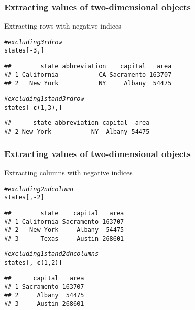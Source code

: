 \documentclass[12pt]{beamer}\usepackage[]{graphicx}\usepackage[]{color}
\makeatletter
\newcommand{\hlnum}[1]{\textcolor[rgb]{0.686,0.059,0.569}{#1}}%
\newcommand{\hlcom}[1]{\textcolor[rgb]{0.678,0.584,0.686}{\textit{#1}}}%
\newcommand{\hlopt}[1]{\textcolor[rgb]{0,0,0}{#1}}%
\newcommand{\hlstd}[1]{\textcolor[rgb]{0.345,0.345,0.345}{#1}}%
\newcommand{\hlkwd}[1]{\textcolor[rgb]{0.737,0.353,0.396}{\textbf{#1}}}%
\newenvironment{kframe}{%
 \def\at@end@of@kframe{}%
 \ifinner\ifhmode%
  \def\at@end@of@kframe{\end{minipage}}%
  \begin{minipage}{\columnwidth}%
 \fi\fi%
 \def\FrameCommand##1{\hskip\@totalleftmargin \hskip-\fboxsep
 \colorbox{shadecolor}{##1}\hskip-\fboxsep
     \hskip-\linewidth \hskip-\@totalleftmargin \hskip\columnwidth}%
 \MakeFramed {\advance\hsize-\width
   \@totalleftmargin\z@ \linewidth\hsize
   \@setminipage}}%
 {\par\unskip\endMakeFramed%
 \at@end@of@kframe}
\newenvironment{knitrout}{}{} %
\makeatother
\begin{document}

\begin{frame}[fragile]
\frametitle{Extracting values of two-dimensional objects}

Extracting rows with negative indices
\begin{knitrout}\footnotesize
{}\color{fgcolor}\begin{kframe}
\begin{alltt}
\hlcom{# excluding 3rd row}
\hlstd{states[}\hlopt{-}\hlnum{3}\hlstd{, ]}
\end{alltt}
\begin{verbatim}
##        state abbreviation    capital   area
## 1 California           CA Sacramento 163707
## 2   New York           NY     Albany  54475
\end{verbatim}
\begin{alltt}
\hlcom{# excluding 1st and 3rd row}
\hlstd{states[}\hlopt{-}\hlkwd{c}\hlstd{(}\hlnum{1}\hlstd{,} \hlnum{3}\hlstd{), ]}
\end{alltt}
\begin{verbatim}
##      state abbreviation capital  area
## 2 New York           NY  Albany 54475
\end{verbatim}
\end{kframe}
\end{knitrout}

\end{frame}


\begin{frame}[fragile]
\frametitle{Extracting values of two-dimensional objects}

Extracting columns with negative indices
\begin{knitrout}\footnotesize
{}\color{fgcolor}\begin{kframe}
\begin{alltt}
\hlcom{# excluding 2nd column}
\hlstd{states[ ,} \hlopt{-}\hlnum{2}\hlstd{]}
\end{alltt}
\begin{verbatim}
##        state    capital   area
## 1 California Sacramento 163707
## 2   New York     Albany  54475
## 3      Texas     Austin 268601
\end{verbatim}
\begin{alltt}
\hlcom{# excluding 1st and 2dn columns}
\hlstd{states[ ,} \hlopt{-}\hlkwd{c}\hlstd{(}\hlnum{1}\hlstd{,} \hlnum{2}\hlstd{)]}
\end{alltt}
\begin{verbatim}
##      capital   area
## 1 Sacramento 163707
## 2     Albany  54475
## 3     Austin 268601
\end{verbatim}
\end{kframe}
\end{knitrout}

\end{frame}
\end{document}

